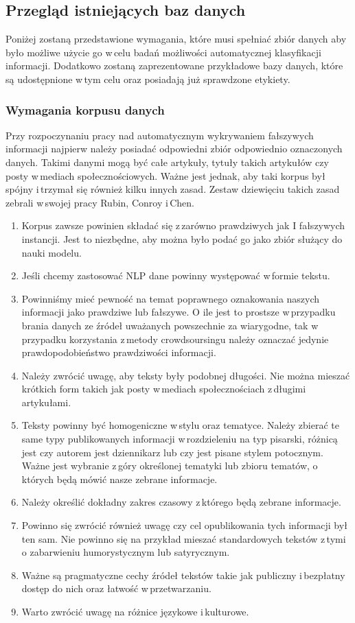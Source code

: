 \subsection{Przegląd istniejących baz danych}
Poniżej zostaną przedstawione wymagania, które musi spełniać zbiór danych aby było możliwe użycie go w\,celu badań możliwości automatycznej klasyfikacji informacji. Dodatkowo zostaną zaprezentowane przykładowe bazy danych, które są udostępnione w\,tym celu oraz posiadają już sprawdzone etykiety.
\subsubsection{Wymagania korpusu danych}
Przy rozpoczynaniu pracy nad automatycznym wykrywaniem fałszywych informacji najpierw należy posiadać odpowiedni zbiór odpowiednio oznaczonych danych. Takimi danymi mogą być całe artykuły, tytuły takich artykułów czy posty w\,mediach społecznościowych. Ważne jest jednak, aby taki korpus był spójny i\,trzymał się również kilku innych zasad. Zestaw dziewięciu takich zasad zebrali w\,swojej pracy Rubin, Conroy i\,Chen\cite{rubin2015deception}.
\begin{enumerate}
    \item Korpus zawsze powinien składać się z\,zarówno prawdziwych jak I fałszywych instancji. Jest to niezbędne, aby można było podać go jako zbiór służący do nauki modelu.
    \item Jeśli chcemy zastosować NLP dane powinny występować w\,formie tekstu.
    \item Powinniśmy mieć pewność na temat poprawnego oznakowania naszych informacji jako prawdziwe lub fałszywe. O ile jest to prostsze w\,przypadku brania danych ze źródeł uważanych powszechnie za wiarygodne, tak w\,przypadku korzystania z\,metody crowdsoursingu należy oznaczać jedynie prawdopodobieństwo prawdziwości informacji.
    \item Należy zwrócić uwagę, aby teksty były podobnej długości. Nie można mieszać krótkich form takich jak posty w\,mediach społecznościach z\,długimi artykułami.
    \item Teksty powinny być homogeniczne w\,stylu oraz tematyce. Należy zbierać te same typy publikowanych informacji w\,rozdzieleniu na typ pisarski, różnicą jest czy autorem jest dziennikarz lub czy jest pisane stylem potocznym. Ważne jest wybranie z\,góry określonej tematyki lub zbioru tematów, o których będą mówić nasze zebrane informacje.
    \item Należy określić dokładny zakres czasowy z\,którego będą zebrane informacje.
    \item Powinno się zwrócić również uwagę czy cel opublikowania tych informacji był ten sam. Nie powinno się na przykład mieszać standardowych tekstów z\,tymi o zabarwieniu humorystycznym lub satyrycznym.
    \item Ważne są pragmatyczne cechy źródeł tekstów takie jak publiczny i\,bezpłatny dostęp do nich oraz łatwość w\,przetwarzaniu.
    \item Warto zwrócić uwagę na różnice językowe i\,kulturowe.

\end{enumerate}


